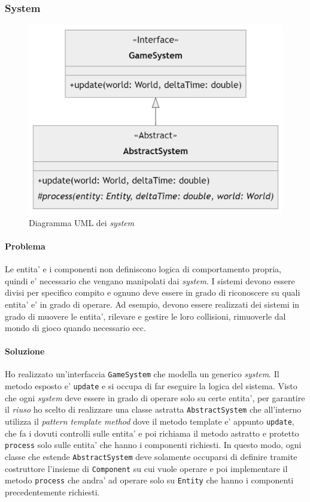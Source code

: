 \documentclass[a4paper,12pt]{report}
\begin{document}
\subsubsection{System}

\begin{figure}[h]
	\centering
	\includegraphics[width=\textwidth]{uml/uml_system.png}
	\caption{Diagramma UML dei \textit{system}} 
\end{figure}

\paragraph{Problema}
Le entita' e i componenti non definiscono logica di comportamento propria, quindi e' necessario che vengano manipolati dai \textit{system}. I sistemi devono essere divisi per specifico compito e ognuno deve essere in grado di riconoscere su quali entita' e' in grado di operare. Ad esempio, devono essere realizzati dei sistemi in grado di muovere le entita', rilevare e gestire le loro collisioni, rimuoverle dal mondo di gioco quando necessario ecc.

\paragraph[]{Soluzione}
Ho realizzato un'interfaccia \texttt{GameSystem} che modella un generico \textit{system}. Il metodo esposto e' \texttt{update} e si occupa di far eseguire la logica del sistema. Visto che ogni \textit{system} deve essere in grado di operare solo su certe entita', per garantire il \textit{riuso} ho scelto di realizzare una classe astratta \texttt{AbstractSystem} che all'interno utilizza il \textit{pattern template method} dove il metodo template e' appunto \texttt{update}, che fa i dovuti controlli sulle entita' e poi richiama il metodo astratto e protetto \texttt{process} solo sulle entita' che hanno i componenti richiesti. In questo modo, ogni classe che estende \texttt{AbstractSystem} deve solamente occuparsi di definire tramite costruttore l'insieme di \texttt{Component} su cui vuole operare e poi implementare il metodo \texttt{process} che andra' ad operare solo su \texttt{Entity} che hanno i componenti precedentemente richiesti.
\end{document}
